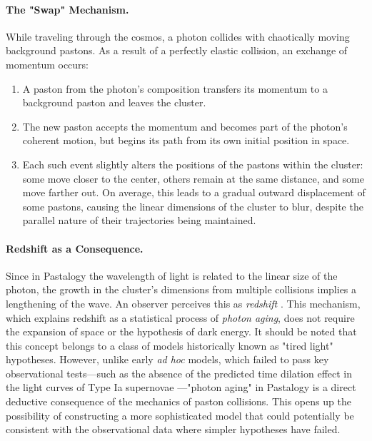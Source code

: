\documentclass[pdflatex,sn-mathphys-num]{sn-jnl}
\begin{document}
\paragraph{The "Swap" Mechanism.}
While traveling through the cosmos, a photon collides with chaotically moving background pastons. As a result of a perfectly elastic collision, an exchange of momentum occurs:
\begin{enumerate}
  \item A paston from the photon's composition transfers its momentum to a background paston and leaves the cluster.
  \item The new paston accepts the momentum and becomes part of the photon's coherent motion, but begins its path from its own initial position in space.
  \item Each such event slightly alters the positions of the pastons within the cluster: some move closer to the center, others remain at the same distance, and some move farther out. On average, this leads to a gradual outward displacement of some pastons, causing the linear dimensions of the cluster to blur, despite the parallel nature of their trajectories being maintained.
\end{enumerate}

\paragraph{Redshift as a Consequence.}
Since in Pastalogy the wavelength of light is related to the linear size of the photon, the growth in the cluster's dimensions from multiple collisions implies a lengthening of the wave. An observer perceives this as \emph{redshift} \cite{hubble1929}. This mechanism, which explains redshift as a statistical process of \emph{photon aging}, does not require the expansion of space or the hypothesis of dark energy. It should be noted that this concept belongs to a class of models historically known as "tired light" hypotheses. However, unlike early \textit{ad hoc} models, which failed to pass key observational tests---such as the absence of the predicted time dilation effect in the light curves of Type Ia supernovae \cite{goldhaber2001-dilation}---"photon aging" in Pastalogy is a direct deductive consequence of the mechanics of paston collisions. This opens up the possibility of constructing a more sophisticated model that could potentially be consistent with the observational data where simpler hypotheses have failed.
\end{document}
